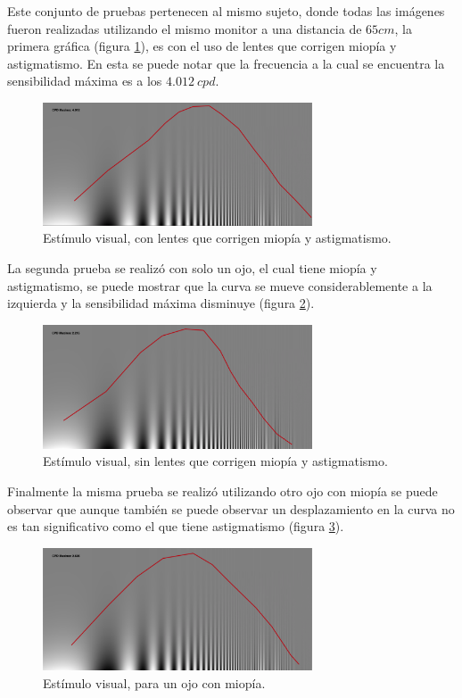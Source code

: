 \documentclass[conference]{IEEEtran}
\begin{document}
Este conjunto de pruebas pertenecen al mismo sujeto, donde todas las imágenes fueron
realizadas utilizando el mismo monitor a una distancia de $65cm$, la primera
gráfica (figura \ref{normal}), es con el uso de lentes que corrigen miopía y astigmatismo.
En esta se puede notar que la frecuencia a la cual se encuentra la sensibilidad
máxima es a los $4.012\ cpd$.

\begin{figure}[htbp]
\centerline{\includegraphics[width=80mm]{code/Normal}}
\caption{Estímulo visual, con lentes que corrigen miopía y astigmatismo.}
\label{normal}
\end{figure}


La segunda prueba se realizó con solo un ojo, el cual
tiene miopía y astigmatismo, se puede mostrar que la curva se mueve
considerablemente a la izquierda y la sensibilidad máxima disminuye (figura \ref{astigmatismo}).

\begin{figure}[htbp]
\centerline{\includegraphics[width=80mm]{code/astigmatismo}}
\caption{Estímulo visual, sin lentes que corrigen miopía y astigmatismo.}
\label{astigmatismo}
\end{figure}

Finalmente la misma prueba se realizó utilizando otro ojo con
miopía se puede observar que aunque también se puede observar un desplazamiento
en la curva no es tan significativo como el que tiene astigmatismo (figura \ref{miopia}).


\begin{figure}[htbp]
\centerline{\includegraphics[width=80mm]{code/miopia}}
\caption{Estímulo visual, para un ojo con miopía.}
\label{miopia}
\end{figure}
\end{document}
